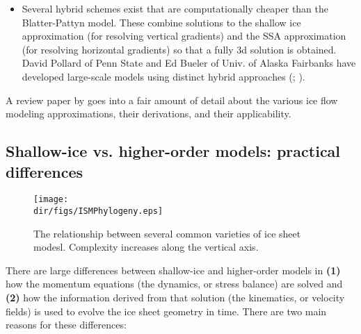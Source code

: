 \begin{itemize}
\item Several hybrid schemes exist that are computationally cheaper than the Blatter-Pattyn model. These combine solutions to the shallow ice approximation (for resolving vertical gradients) and the SSA approximation (for resolving horizontal gradients) so that a fully 3d solution is obtained. 
David Pollard of Penn State and Ed Bueler of Univ. of Alaska Fairbanks have developed large-scale models using distinct hybrid approaches (\citet{Bueler:2009ee}; \citet{Pollard:2009ed}).
\end{itemize}

A review paper by \citet{Schoof:2013is} goes into a fair amount of detail about the various ice flow modeling approximations, their derivations, and their applicability.

\subsection{Shallow-ice vs. higher-order models: practical differences}

\begin{figure}
  \begin{center}
    \texttt{[image: \\dir/figs/ISMPhylogeny.eps]}
   \end{center}
  \caption{The relationship between several common varieties of ice sheet modesl. Complexity increases along the vertical axis.}
   \label{fig:phylogeny}
\end{figure} 

There are large differences between shallow-ice and higher-order models in 
\textbf{(1)} how the momentum equations (the dynamics, or stress balance) are solved and 
\textbf{(2)} how the information derived from that solution (the kinematics, or velocity fields) is used to evolve the ice sheet geometry in time. There are two main reasons for these differences:

